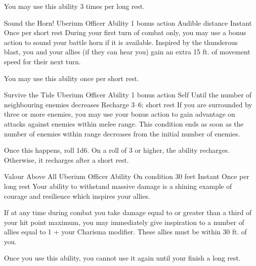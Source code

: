 You may use this ability 3 times per long rest.


\ability%
    {Sound the Horn!}
    {Uberium Officer Ability}
    {1 bonus action}
    {Audible distance}
    {Instant}
    {Once per short rest}
During your first turn of combat only,
you may use a bonus action to sound your battle horn
if it is available.
Inspired by the thunderous blast,
you and your allies (if they can hear you)
gain an extra 15 ft. of movement speed
for their next turn.

You may use this ability once per short rest.


\ability%
    {Survive the Tide}
    {Uberium Officer Ability}
    {1 bonus action}
    {Self}
    {Until the number of neighbouring enemies decreases}
    {Recharge 3--6; short rest}
If you are surrounded by three or more enemies,
you may use your bonus action to gain advantage on attacks
against enemies within melee range.
This condition ends as soon as the number of enemies
within range decreases from the initial number of enemies.

Once this happens, roll 1d6.
On a roll of 3 or higher, 
the ability recharges.
Otherwise, it recharges after a short rest.


\ability%
    {Valour Above All}
    {Uberium Officer Ability}
    {On condition}
    {30 feet}
    {Instant}
    {Once per long rest}
Your ability to withstand massive damage
is a shining example of courage and resilience
which inspires your allies.

If at any time during combat you take damage
equal to or greater than a third of your hit point maximum,
you may immediately give inspiration to a number of allies
equal to 1 + your Charisma modifier.
These allies must be within 30 ft. of you.

Once you use this ability,
you cannot use it again until your finish a long rest.



